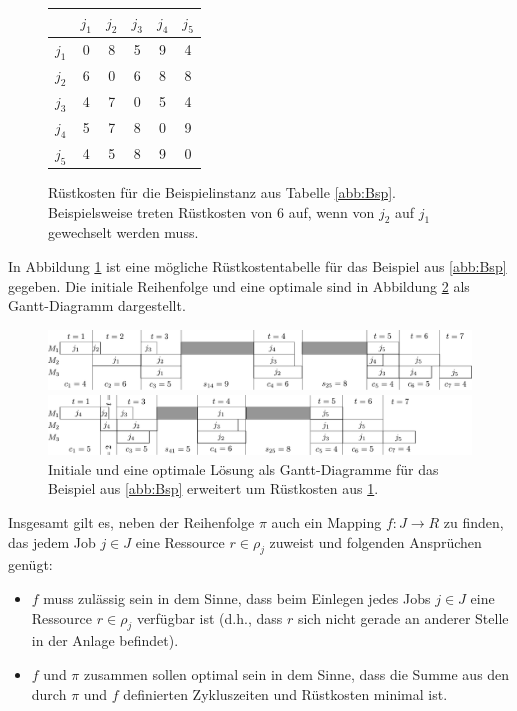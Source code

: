 \documentclass{scrreprt}
\begin{document}
\begin{figure}
    \begin{center}
        \begin{tabular}{c|ccccc}
            & $j_1$ & $j_2$ & $j_3$ & $j_4$ & $j_5$ \\ \hline
            $j_1$ & 0 & 8 & 5 & 9 & 4\\
            $j_2$ & 6 & 0 & 6 & 8 & 8\\
            $j_3$ & 4 & 7 & 0 & 5 & 4\\
            $j_4$ & 5 & 7 & 8 & 0 & 9\\
            $j_5$ & 4 & 5 & 8 & 9 & 0
        \end{tabular}
    \end{center}
    \caption{
        \label{abb:BspRes}
        Rüstkosten für die Beispielinstanz aus Tabelle \ref{abb:Bsp}.
        Beispielsweise treten Rüstkosten von $6$ auf, wenn von $j_2$ auf $j_1$ gewechselt werden muss.
    }
\end{figure}
In Abbildung \ref{abb:BspRes} ist eine mögliche Rüstkostentabelle für das Beispiel aus \ref{abb:Bsp} gegeben.
Die initiale Reihenfolge und eine optimale sind in Abbildung \ref{abb:ganttres} als Gantt-Diagramm dargestellt.
\begin{figure}
    \begin{center}
        \includegraphics[width=\textwidth]{graphics/bspresinit.pdf}
    \end{center}
    \begin{center}
        \includegraphics[width=\textwidth]{graphics/bspresopt.pdf}
    \end{center}
    \caption{
        \label{abb:ganttres}
        Initiale und eine optimale Lösung als Gantt-Diagramme für das Beispiel aus \ref{abb:Bsp} erweitert um Rüstkosten aus \ref{abb:BspRes}.
    }
\end{figure}

Insgesamt gilt es, neben der Reihenfolge $\pi$ auch ein Mapping $f:J\rightarrow R$ zu finden, 
das jedem Job $j\in J$ eine Ressource $r\in\rho_j$ zuweist und folgenden Ansprüchen genügt:
\begin{itemize}
    \item $f$ muss zulässig sein in dem Sinne, dass beim Einlegen jedes Jobs $j\in J$ eine Ressource $r\in\rho_j$ verfügbar ist
        (d.h., dass $r$ sich nicht gerade an anderer Stelle in der Anlage befindet).
    \item $f$ und $\pi$ zusammen sollen optimal sein in dem Sinne, dass die Summe aus den durch $\pi$ und $f$ definierten Zykluszeiten und 
        Rüstkosten minimal ist.
\end{itemize}
\end{document}
